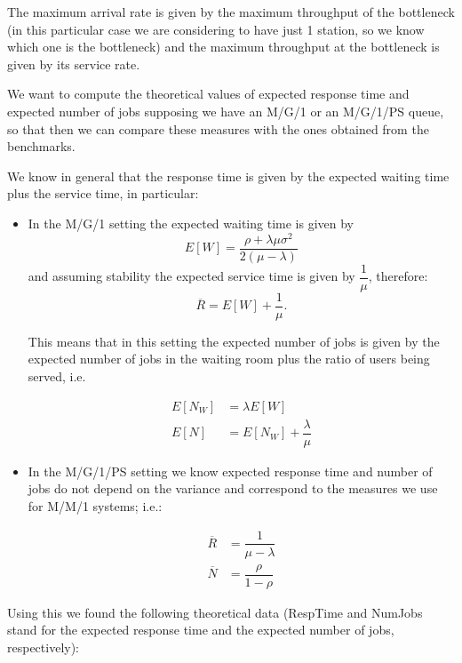 \documentclass[11pt]{scrartcl} %
\begin{document}
The maximum arrival rate is given by the maximum throughput of the bottleneck (in this particular case we are considering to have just 1 station, so we know which one is the bottleneck) and the maximum throughput at the bottleneck is given by its service rate.

We want to compute the theoretical values of expected response time and expected number of jobs supposing we have an M/G/1 or an M/G/1/PS queue, so that then we can compare these measures with the ones obtained from the benchmarks.

We know in general that the response time is given by the expected waiting time plus the service time, in particular:

\begin{itemize}
\item[\adforn{43}] In the M/G/1 setting the expected waiting time is given by $$E[W]=\dfrac{\rho+\lambda\mu\sigma^2}{2(\mu-\lambda)}$$ and assuming stability the expected service time is given by $\dfrac{1}{\mu}$, therefore:
$$\overline{R}=E[W]+\dfrac{1}{\mu} .$$

This means that in this setting the expected number of jobs is given by the expected number of jobs in the waiting room plus the ratio of users being served, i.e.

\begin{align*}
E[N_W] &= \lambda E[W]\\
E[N] &= E[N_W]+\dfrac{\lambda}{\mu}
\end{align*}

\item[\adforn{43}] In the M/G/1/PS setting we know expected response time and number of jobs do not depend on the variance and correspond to the measures we use for M/M/1 systems; i.e.:

\begin{align*}
\overline{R} &= \dfrac{1}{\mu-\lambda}\\
\overline{N} &= \dfrac{\rho}{1-\rho}
\end{align*}

\end{itemize}

Using this we found the following theoretical data (RespTime and NumJobs stand for the expected response time and the expected number of jobs, respectively):
\end{document}
